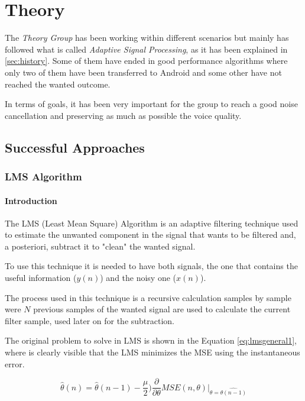 \documentclass[11pt,a4paper,english]{book}  %
\theoremstyle{definition}  %
\theoremstyle{plain}  %
\theoremstyle{remark}  %
\begin{document}
\chapter{Theory}
\label{sec:theory}

The \textit{Theory Group} has been working within different scenarios but mainly has followed what is called \textit{Adaptive Signal Processing}, as it has been explained in \ref{sec:history}. Some of them have ended in good performance algorithms where only two of them have been transferred to Android and some other have not reached the wanted outcome.

In terms of goals, it has been very important for the group to reach a good noise cancellation and preserving as much as possible the voice quality.

\section{Successful Approaches}

	\subsection{LMS Algorithm}
	\label{lms}
	
		\subsubsection{Introduction}
	
	The LMS (Least Mean Square) Algorithm \cite{asp} is an adaptive filtering technique used to estimate the unwanted component in the signal that wants to be filtered and, a posteriori, subtract it to "clean" the wanted signal.
	
	To use this technique it is needed to have both signals, the one that contains the useful information ($y(n)$) and the noisy one ($x(n)$).
	
	The process used in this technique is a recursive calculation samples by sample were $N$ previous samples of the wanted signal are used to calculate the current filter sample, used later on for the subtraction.
	
	The original problem to solve in LMS is shown in the Equation \ref{eq:lmsgeneral1}, where is clearly visible that the LMS minimizes the MSE using the instantaneous error.
	
		\begin{equation}
	\label{eq:lmsgeneral1}
		\hat{\theta}(n) = \hat{\theta}(n-1) -\frac{\mu}{2})\frac{\partial}{\partial \theta}MSE(n,\theta)\rvert_{\theta=\hat{\theta(n-1)}}
	\end{equation}
	
\end{document}
